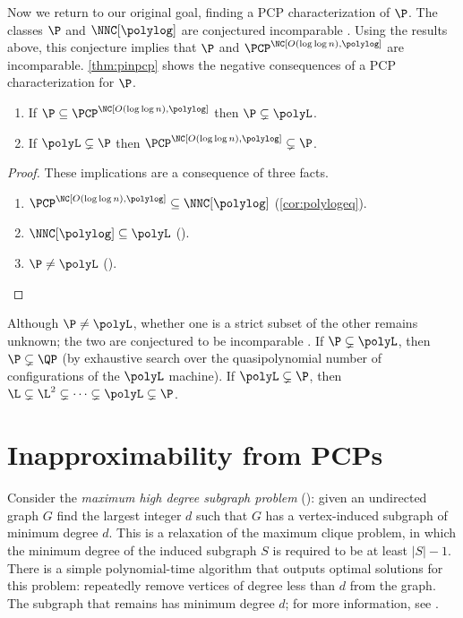 Now we return to our original goal, finding a PCP characterization of $\P$.
The classes $\P$ and $\NNC[\polylog]$ are conjectured incomparable \autocite{wolf94}.
Using the results above, this conjecture implies that $\P$ and $\PCP^\NC[O(\loglog n), \polylog]$ are incomparable.
\autoref{thm:pinpcp} shows the negative consequences of a PCP characterization for $\P$.

\begin{theorem}\label{thm:pinpcp}
  \mbox{}
  \begin{enumerate}
  \item If $\P \subseteq \PCP^\NC[O(\loglog n), \polylog]$ then $\P \subsetneq \polyL$.
  \item If $\polyL \subsetneq \P$ then $\PCP^\NC[O(\loglog n), \polylog] \subsetneq \P$.
  \end{enumerate}
\end{theorem}
\begin{proof}
  These implications are a consequence of three facts.
  \begin{enumerate}
  \item $\PCP^\NC[O(\loglog n), \polylog] \subseteq \NNC[\polylog]$ (\autoref{cor:polylogeq}).
  \item $\NNC[\polylog] \subseteq \polyL$ (\autocite[Corollary~3.2]{wolf94}).
  \item $\P \neq \polyL$ (\autocite[Theorem~3.10]{book76}). \qedhere
  \end{enumerate}
\end{proof}

Although $\P \neq \polyL$, whether one is a strict subset of the other remains unknown; the two are conjectured to be incomparable \autocite[Section~2.5.1]{johnson90}.
If $\P \subsetneq \polyL$, then $\P \subsetneq \QP$ (by exhaustive search over the quasipolynomial number of configurations of the $\polyL$ machine).
If $\polyL \subsetneq \P$, then $\L \subsetneq \L^2 \subsetneq \dotsb \subsetneq \polyL \subsetneq \P$.

\section{Inapproximability from PCPs}

Consider the \emph{maximum high degree subgraph problem} (\autocite{am84}): given an undirected graph $G$ find the largest integer $d$ such that $G$ has a vertex-induced subgraph of minimum degree $d$.
This is a relaxation of the maximum clique problem, in which the minimum degree of the induced subgraph $S$ is required to be at least $|S| - 1$.
There is a simple polynomial-time algorithm that outputs optimal solutions for this problem: repeatedly remove vertices of degree less than $d$ from the graph.
The subgraph that remains has minimum degree $d$; for more information, see \autocite[Problem~A.2.7]{ghr95}.

